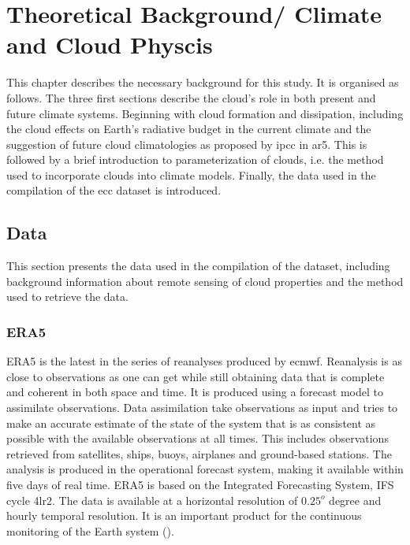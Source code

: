 \setcounter{chapter}{1} 
\chapter{Theoretical Background/ Climate and Cloud Physcis} \label{ch:theoretical_back}
This chapter describes the necessary background for this study. It is organised as follows. The three first sections describe the cloud's role in both present and future climate systems. Beginning with cloud formation and dissipation, including the cloud effects on Earth's radiative budget in the current climate and the suggestion of future cloud climatologies as proposed by \acrshort{ipcc} in \acrshort{ar5}. This is followed by a brief introduction to parameterization of clouds, i.e. the method used to incorporate clouds into climate models.
Finally, the data used in the compilation of the \acrshort{ecc} dataset is introduced. 





\section{Data}
This section presents the data used in the compilation of the dataset, including background information about remote sensing of cloud properties and the method used to retrieve the data. 

\subsection{ERA5} \label{sec:era5}
ERA5 is the latest in the series of reanalyses produced by \acrfull{ecmwf}. Reanalysis is as close to observations as one can get while still obtaining data that is complete and coherent in both space and time. It is produced using a forecast model to assimilate observations. Data assimilation take observations as input and tries to make an accurate estimate of the state of the system that is as consistent as possible with the available observations at all times. This includes observations retrieved from satellites, ships, buoys, airplanes and ground-based stations. The analysis is produced in the operational forecast system, making it available within five days of real time. ERA5 is based on the Integrated Forecasting System, IFS cycle 4lr2. The data is available at a horizontal resolution of $0.25^o$ degree and hourly temporal resolution. It is an important product for the continuous monitoring of the Earth system 
(\cite{Hersbach2018OperationalStatus}).

